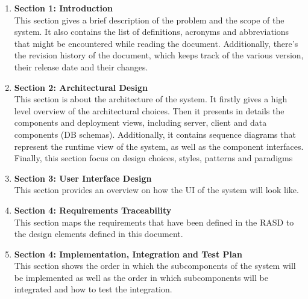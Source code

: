 \begin{enumerate}
    \item \textbf{Section 1: Introduction} \\
    This section gives a brief description of the problem and the scope of the system.
    It also contains the list of definitions, acronyms and abbreviations that might be encountered
    while reading the document.
    Additionally, there's the revision history of the document, which keeps track of the various
    version, their release date and their changes.
    \item \textbf{Section 2: Architectural Design} \\
    This section is about the architecture of the system. 
    It firstly gives a high level overview of the architectural choices.
    Then it presents in details the components and deployment views, including server, client and data components (DB schemas).
    Additionally, it contains sequence diagrams that represent the runtime view of the system, as well as the component interfaces.
    Finally, this section focus on design choices, styles, patterns and paradigms
    \item \textbf{Section 3: User Interface Design} \\
    This section provides an overview on how the UI of the system will look like.
    \item \textbf{Section 4: Requirements Traceability} \\
    This section maps the requirements that have been defined in the RASD to the design elements defined in this document.
    \item \textbf{Section 4: Implementation, Integration and Test Plan} \\
    This section shows the order in which the subcomponents of the system will be implemented as well
    as the order in which subcomponents will be integrated and how to test the integration.
\end{enumerate}